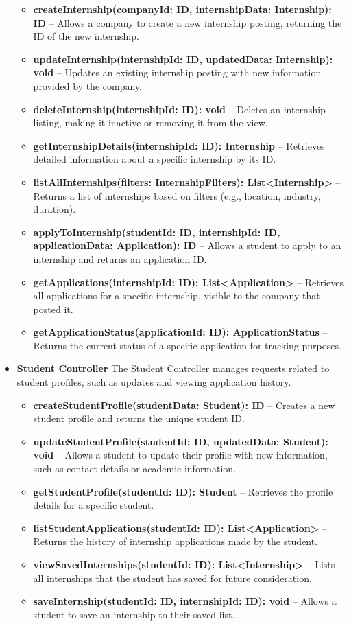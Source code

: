 \begin{itemize}
\begin{itemize}
    \item \textbf{createInternship(companyId: ID, internshipData: Internship): ID} – Allows a company to create a new internship posting, returning the ID of the new internship.
    \item \textbf{updateInternship(internshipId: ID, updatedData: Internship): void} – Updates an existing internship posting with new information provided by the company.
    \item \textbf{deleteInternship(internshipId: ID): void} – Deletes an internship listing, making it inactive or removing it from the view.
    \item \textbf{getInternshipDetails(internshipId: ID): Internship} – Retrieves detailed information about a specific internship by its ID.
    \item \textbf{listAllInternships(filters: InternshipFilters): List<Internship>} – Returns a list of internships based on filters (e.g., location, industry, duration).
    \item \textbf{applyToInternship(studentId: ID, internshipId: ID, applicationData: Application): ID} – Allows a student to apply to an internship and returns an application ID.
    \item \textbf{getApplications(internshipId: ID): List<Application>} – Retrieves all applications for a specific internship, visible to the company that posted it.
    \item \textbf{getApplicationStatus(applicationId: ID): ApplicationStatus} – Returns the current status of a specific application for tracking purposes.
\end{itemize}
\item \textbf{Student Controller}
The Student Controller manages requests related to student profiles, such as updates and viewing application history.

\begin{itemize}
    \item \textbf{createStudentProfile(studentData: Student): ID} – Creates a new student profile and returns the unique student ID.
    \item \textbf{updateStudentProfile(studentId: ID, updatedData: Student): void} – Allows a student to update their profile with new information, such as contact details or academic information.
    \item \textbf{getStudentProfile(studentId: ID): Student} – Retrieves the profile details for a specific student.
    \item \textbf{listStudentApplications(studentId: ID): List<Application>} – Returns the history of internship applications made by the student.
    \item \textbf{viewSavedInternships(studentId: ID): List<Internship>} – Lists all internships that the student has saved for future consideration.
    \item \textbf{saveInternship(studentId: ID, internshipId: ID): void} – Allows a student to save an internship to their saved list.
\end{itemize}


\end{itemize}
